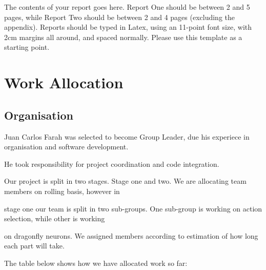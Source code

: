 \documentclass[a4paper,11pt]{article}
\begin{document}
The contents of your report goes here.  Report One should be between 2
and 5 pages, while Report Two should be between 2 and 4 pages
(excluding the appendix).  Reports should be typed in Latex, using an
11-point font size, with 2cm margins all around, and spaced normally.
Please use this template as a starting point.



\section{Work Allocation}


\subsection{Organisation}


Juan Carlos Farah was selected to become Group Leader, due his experiece in organisation and software development.

He took responsibility for project coordination and code integration.


Our project is split in two stages. Stage one and two. We are allocating team members on rolling basis, however in

stage one our team is split in two sub-groups. One sub-group is working on action selection, while other is working

on dragonfly neurons. We assigned members according to estimation of how long each part will take.


The table below shows how we have allocated work so far:
\end{document}
